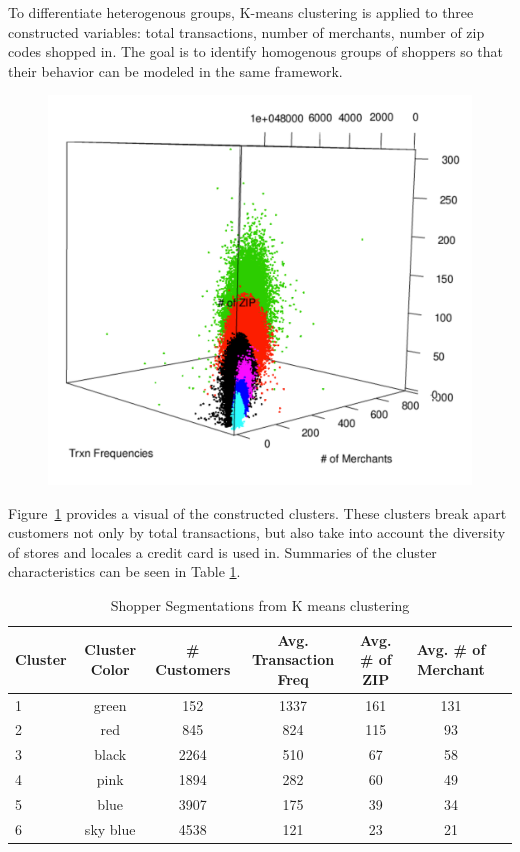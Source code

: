 \documentclass[12pt]{article} %
\begin{document}
To differentiate heterogenous groups, K-means clustering is applied to three constructed variables: total transactions, number of merchants, number of zip codes shopped in.  The goal is to identify homogenous groups of shoppers so that their behavior can be modeled in the same framework.
\begin{figure}[h!]
\centering
\includegraphics[width=6in]{k_means.pdf}
\label{fig:cluster}
\end{figure}
Figure~\ref{fig:cluster} provides a visual of the constructed clusters.  These clusters break apart customers not only by total transactions, but also take into account the diversity of stores and locales a credit card is used in.  Summaries of the cluster characteristics can be seen in Table \ref{tab:table1}.
\begin{table}[h!]\footnotesize
\centering
\vspace{10pt}
\caption{Shopper Segmentations from K means clustering}
\begin{tabular}{l*{5}{c}r}
\hline
Cluster & Cluster Color & \# Customers & Avg. Transaction Freq & Avg. \# of ZIP &  Avg. \# of Merchant \\
\hline
1	& green& 152	&1337 	&161 &	131\\
2	&red&845	&824 	&115	&93\\
3	&black&2264	&510 	&67 &	58\\
4	&pink&1894	&282 	&60 	&49 \\
5	&blue&3907	&175 	&39 &	34\\
6	&sky blue&4538	&121 	&23 &	21\\
\hline
\end{tabular}\\
\label{tab:table1}
\end{table}
\end{document}
